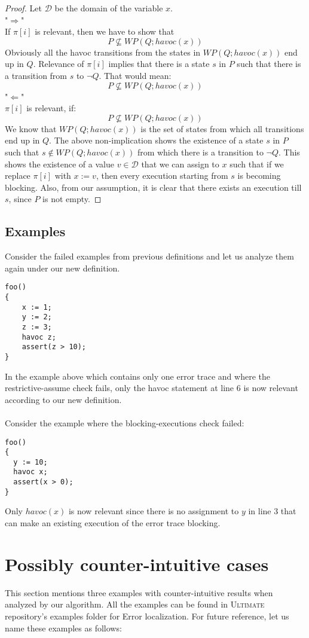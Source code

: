 \documentclass{article}
\newcommand{\ultimate}{\textsc{Ultimate}\xspace} %
\begin{document}
\begin{proof}
Let $\mathcal{D}$ be the domain of the variable $x$. \\
"$\Rightarrow$"\\
If $\pi[i]$ is relevant, then we have to show that\\
$$P \not \subseteq WP(Q;havoc(x))$$
Obviously all the havoc transitions from the states in $WP(Q;havoc(x))$ end up in $Q$. Relevance of $\pi[i]$ implies that there is a state $s$ in $P$ such that there is a transition from $s$ to $\neg Q$. That would mean:
$$P \not \subseteq WP(Q;havoc(x))$$
"$\Leftarrow$"\\
$\pi[i]$ is relevant, if:
$$P \not \subseteq WP(Q;havoc(x))$$
We know that $WP(Q;havoc(x))$ is the set of states from which all transitions end up in $Q$. The above non-implication shows the existence of a state $s$ in $P$ such that $s \not \in WP(Q; havoc(x))$  from which there is a transition to $\neg Q$. This shows the existence of a value $v \in \mathcal{D}$ that we can assign to $x$ such that if we replace $\pi[i]$ with $x:=v$, then every execution starting from $s$ is becoming blocking. Also, from our assumption, it is clear that there exists an execution till $s$, since $P$ is not empty.
\end{proof}
\subsection{Examples}
Consider the failed examples from previous definitions and let us analyze them again under our new definition.
\begin{lstlisting}
foo()
{
	x := 1;
	y := 2;
	z := 3;
	havoc z;
	assert(z > 10);
}
\end{lstlisting}
In the example above which contains only one error trace and where the restrictive-assume check fails, only the havoc statement at line 6 is now relevant according to our new definition. \\
\\
Consider the example where the blocking-executions check failed:
\begin{lstlisting}
foo()
{
  y := 10;
  havoc x;
  assert(x > 0);
}
\end{lstlisting}
Only $havoc(x)$ is now relevant since there is no assignment to $y$ in line 3 that can make an existing execution of the error trace blocking.


\section{Possibly counter-intuitive cases}
This section mentions three examples with  counter-intuitive results when analyzed by our algorithm. All the examples can be found in \ultimate repository's examples folder for Error localization. For future reference, let us name these examples as follows:
\end{document}
